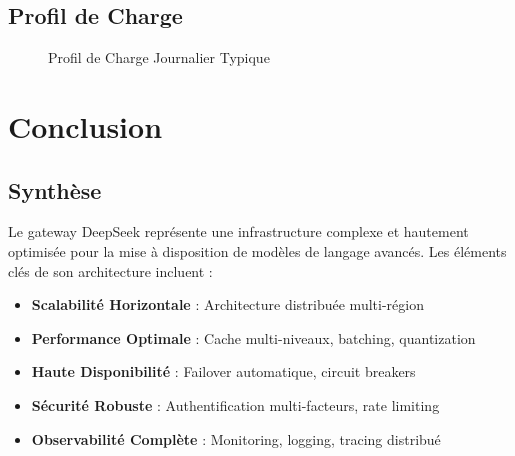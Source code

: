 \documentclass[12pt,a4paper]{article}
\begin{document}
\subsection{Profil de Charge}

\begin{figure}[h]
\centering
{}
\caption{Profil de Charge Journalier Typique}
\end{figure}

\newpage
\section{Conclusion}

\subsection{Synthèse}

Le gateway DeepSeek représente une infrastructure complexe et hautement optimisée pour la mise à disposition de modèles de langage avancés. Les éléments clés de son architecture incluent :

\begin{itemize}[leftmargin=2cm]
    \item \textbf{Scalabilité Horizontale} : Architecture distribuée multi-région
    \item \textbf{Performance Optimale} : Cache multi-niveaux, batching, quantization
    \item \textbf{Haute Disponibilité} : Failover automatique, circuit breakers
    \item \textbf{Sécurité Robuste} : Authentification multi-facteurs, rate limiting
    \item \textbf{Observabilité Complète} : Monitoring, logging, tracing distribué
\end{itemize}
\end{document}

